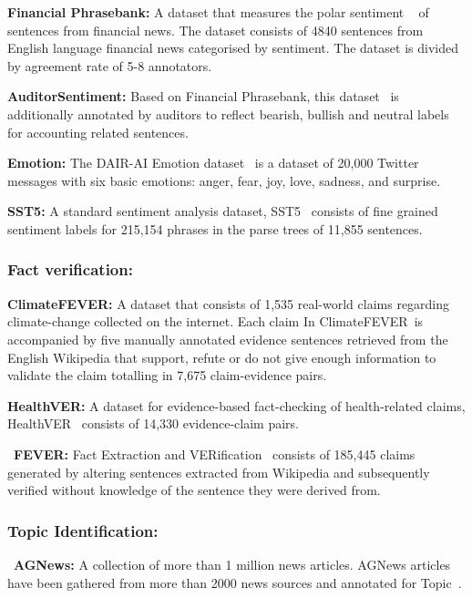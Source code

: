 \noindent\textbf{Financial Phrasebank:} A dataset that measures the polar sentiment ~\citep{Malo2014GoodDO} of sentences from financial news. The dataset consists of 4840 sentences from English language financial news categorised by sentiment. The dataset is divided by agreement rate of 5-8 annotators.

\noindent\textbf{AuditorSentiment:} Based on Financial Phrasebank, this dataset~\citep{AuditorSentiment} is additionally annotated by auditors to reflect bearish, bullish and neutral labels for accounting related sentences. 

\noindent\textbf{Emotion:} The DAIR-AI Emotion dataset~\citep{saravia-etal-2018-carer} is a dataset of 20,000 Twitter messages with six basic emotions: anger, fear, joy, love, sadness, and surprise. 

\noindent\textbf{SST5:} A standard sentiment analysis dataset, SST5~\citep{socher2013recursive} consists of fine grained sentiment labels for 215,154 phrases in the parse trees of 11,855 sentences. 

\subsubsection{Fact verification:} 

\noindent\textbf{ClimateFEVER:} A dataset that consists of 1,535 real-world claims regarding climate-change collected on the internet. Each claim In ClimateFEVER~\citep{diggelmann2020climatefever}is accompanied by five manually annotated evidence sentences retrieved from the English Wikipedia that support, refute or do not give enough information to validate the claim totalling in 7,675 claim-evidence pairs.

\noindent\textbf{HealthVER:} A dataset for  evidence-based fact-checking of health-related claims, HealthVER~\citep{sarrouti2021evidence} consists of 14,330 evidence-claim pairs. 

~\noindent\textbf{FEVER:} Fact Extraction and VERification~\citep{thorne2018fever} consists of 185,445 claims generated by altering sentences extracted from Wikipedia and subsequently verified without knowledge of the sentence they were derived from.

\subsubsection{Topic Identification:}

~\noindent\textbf{AGNews:}  A collection of more than 1 million news articles. AGNews articles have been gathered from more than 2000 news sources and annotated for Topic~\citep{Gulli}.

